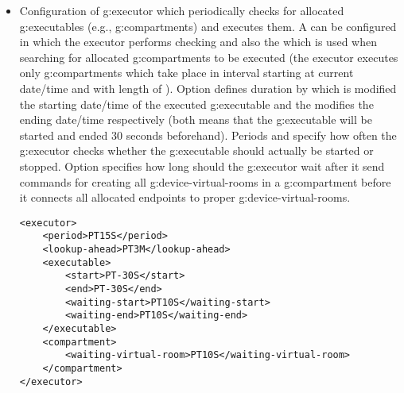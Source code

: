 \begin{itemize}
\item Configuration of \gls{g:executor} which periodically checks for allocated \glspl{g:executable} (e.g., \glspl{g:compartment}) and executes them. A  can be configured in which the executor performs checking and also the  which is used when searching for allocated \glspl{g:compartment} to be executed (the executor executes only \glspl{g:compartment} which take place in interval starting at current date/time and with length of ). Option  defines duration by which is modified the starting date/time of the executed \gls{g:executable} and the  modifies the ending date/time respectively (both  means that the \gls{g:executable} will be started and ended 30 seconds beforehand). Periods  and  specify how often the \gls{g:executor} checks whether the \gls{g:executable} should actually be started or stopped. Option  specifies how long should the \gls{g:executor} wait after it send commands for creating all \glspl{g:device-virtual-room} in a \gls{g:compartment} before it connects all allocated endpoints to proper \glspl{g:device-virtual-room}.
\begin{verbatim}
<executor>
    <period>PT15S</period>
    <lookup-ahead>PT3M</lookup-ahead>
    <executable>
        <start>PT-30S</start>
        <end>PT-30S</end>
        <waiting-start>PT10S</waiting-start>
        <waiting-end>PT10S</waiting-end>
    </executable>
    <compartment>
        <waiting-virtual-room>PT10S</waiting-virtual-room>
    </compartment>
</executor>
\end{verbatim}
\end{itemize}

